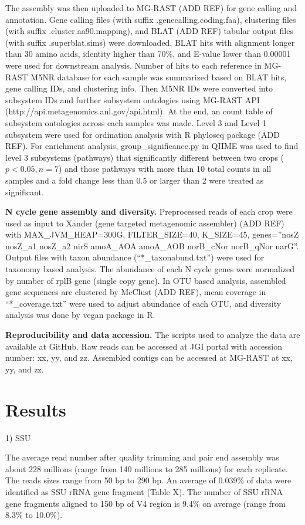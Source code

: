 \documentclass[12pt]{article}
\begin{document}
The assembly was then uploaded to MG-RAST (ADD REF) for gene calling and annotation. Gene calling files (with suffix .genecalling.coding.faa), clustering files (with suffix .cluster.aa90.mapping), and BLAT (ADD REF) tabular output files (with suffix .superblat.sims) were downloaded. BLAT hits with alignment longer than 30 amino acids, identity higher than 70\%, and E-value lower than 0.00001 were used for downstream analysis. Number of hits to each reference in MG-RAST M5NR database for each sample was summarized based on BLAT hits, gene calling IDs, and clustering info. Then M5NR IDs were converted into subsystem IDs and further subsystem ontologies using MG-RAST API (http://api.metagenomics.anl.gov/api.html). At the end, an count table of subsystem ontologies across each samples was made. Level 3 and Level 1 subsystem were used for ordination analysis with R phyloseq package (ADD REF). For enrichment analysis, group\_significance.py in QIIME was used to find level 3 subsystems (pathways) that significantly different between two crops ($p < 0.05, n = 7$) and those pathways with more than 10 total counts in all samples and a fold change less than 0.5 or larger than 2 were treated as significant.

{\bf N cycle gene assembly and diversity.}
Preprocessed reads of each crop were used as input to Xander (gene targeted metagenomic assembler) (ADD REF) with MAX\_JVM\_HEAP=300G, FILTER\_SIZE=40, K\_SIZE=45, genes=''nosZ nosZ\_a1 nosZ\_a2 nirS amoA\_AOA amoA\_AOB norB\_cNor norB\_qNor narG''. Output files with taxon abundance (``*\_taxonabund.txt'') were used for taxonomy based analysis. The abundance of each N cycle genes were normalized by number of rplB gene (single copy gene). In OTU based analysis, assembled gene sequences are clustered by McClust (ADD REF), mean coverage in ``*\_coverage.txt'' were used to adjust abundance of each OTU, and diversity analysis was done by vegan package in R.

{\bf Reproducibility and data accession.}
The scripts used to analyze the data are available at GitHub. Raw reads can be accessed at JGI portal with accession number: xx, yy, and zz. Assembled contigs can be accessed at MG-RAST at xx, yy, and zz.

\section{Results}

1) SSU

The average read number after quality trimming and pair end assembly was about 228 millions (range from 140 millions to 285 millions) for each replicate. The reads sizes range from 50 bp to 290 bp. An average of 0.039\% of data were identified as SSU rRNA gene fragment (Table X). The number of SSU rRNA gene fragments aligned to 150 bp of V4 region is 9.4\% on average (range from 8.3\% to 10.0\%).
\end{document}
